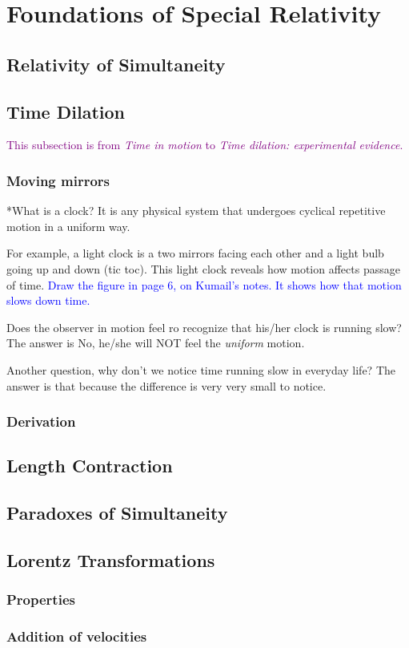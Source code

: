 
\section{Foundations of Special Relativity}

\subsection{Relativity of Simultaneity}

\subsection{Time Dilation}
\textcolor{purple}{This subsection is from \textit{Time in motion} to \textit{Time dilation: experimental evidence}.}

\subsubsection{Moving mirrors}
*What is a clock?
It is any physical system that undergoes cyclical repetitive motion in a uniform way. 

For example, a light clock is a two mirrors facing each other and a light bulb going up and down (tic toc). This light clock reveals
how motion affects passage of time. \textcolor{blue}{Draw the figure in page 6, on Kumail's notes. It shows how that motion slows down time.} 

Does the observer in motion feel ro recognize that his/her clock is running slow?
The answer is No, he/she will NOT feel the \textit{uniform} motion.  

Another question, why don't we notice time running slow in everyday life?
The answer is that because the difference is very very small to notice.
\subsubsection{Derivation}

\subsection{Length Contraction}

\subsection{Paradoxes of Simultaneity}

\subsection{Lorentz Transformations}
\subsubsection{Properties}
\subsubsection{Addition of velocities}